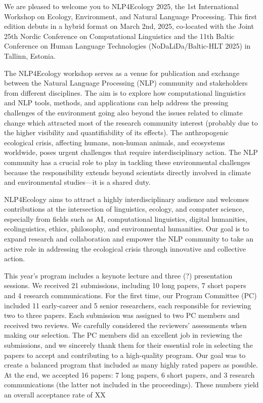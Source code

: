 We are pleased to welcome you to NLP4Ecology 2025, the 1st International Workshop on Ecology, Environment, and Natural Language Processing. This first edition debuts in a hybrid format on March 2nd, 2025, co-located with the Joint 25th Nordic Conference on Computational Linguistics and the 11th Baltic Conference on Human Language Technologies (NoDaLiDa/Baltic-HLT 2025) in Tallinn, Estonia.

The NLP4Ecology workshop serves as a venue for publication and exchange between the Natural Language Processing (NLP) community and stakeholders from different disciplines. The aim is to explore how computational linguistics and NLP tools, methods, and applications can help address the pressing challenges of the environment going also beyond the issues related to climate change which attracted most of the research community interest (probably due to the higher visibility and quantifiability of its effects). The anthropogenic ecological crisis, affecting humans, non-human animals, and ecosystems worldwide, poses urgent challenges that require interdisciplinary action. The NLP community has a crucial role to play in tackling these environmental challenges because the responsibility extends beyond scientists directly involved in climate and environmental studies—it is a shared duty.

NLP4Ecology aims to attract a highly interdisciplinary audience and welcomes contributions at the intersection of linguistics, ecology, and computer science, especially from fields such as AI, computational linguistics, digital humanities, ecolinguistics, ethics, philosophy, and environmental humanities. Our goal is to expand research and collaboration and empower the NLP community to take an active role in addressing the ecological crisis through innovative and collective action.

This year's program includes a keynote lecture and three (?) presentation sessions. We received 21 submissions, including 10 long papers, 7 short papers and 4 research communications. For the first time, our Program Committee (PC) included 11 early-career and 5 senior researchers, each responsible for reviewing two to three papers. Each submission was assigned to two PC members and received two reviews. We carefully considered the reviewers’ assessments when making our selection. The PC members did an excellent job in reviewing the submissions, and we sincerely thank them for their essential role in selecting the papers to accept and contributing to a high-quality program. Our goal was to create a balanced program that included as many highly rated papers as possible. At the end, we accepted 16 papers: 7 long papers, 6 short papers, and 3 research communications (the latter not included in the proceedings). These numbers yield an overall acceptance rate of XX%

